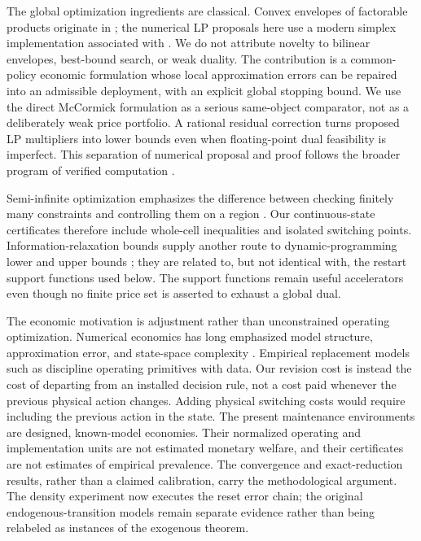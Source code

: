 The global optimization ingredients are classical. Convex envelopes of factorable products originate in \citet{McCormick1976}; the numerical LP proposals here use a modern simplex implementation associated with \citet{HuangfuHall2018}. We do not attribute novelty to bilinear envelopes, best-bound search, or weak duality. The contribution is a common-policy economic formulation whose local approximation errors can be repaired into an admissible deployment, with an explicit global stopping bound. We use the direct McCormick formulation as a serious same-object comparator, not as a deliberately weak price portfolio. A rational residual correction turns proposed LP multipliers into lower bounds even when floating-point dual feasibility is imperfect. This separation of numerical proposal and proof follows the broader program of verified computation \citep{Rump2010}.

Semi-infinite optimization emphasizes the difference between checking finitely many constraints and controlling them on a region \citep{HettichKortanek1993}. Our continuous-state certificates therefore include whole-cell inequalities and isolated switching points. Information-relaxation bounds supply another route to dynamic-programming lower and upper bounds \citep{BrownSmithSun2010,BrownSmith2014}; they are related to, but not identical with, the restart support functions used below. The support functions remain useful accelerators even though no finite price set is asserted to exhaust a global dual.

The economic motivation is adjustment rather than unconstrained operating optimization. Numerical economics has long emphasized model structure, approximation error, and state-space complexity \citep{Judd1998,BrummScheidegger2017}. Empirical replacement models such as \citet{Rust1987} discipline operating primitives with data. Our revision cost is instead the cost of departing from an installed decision rule, not a cost paid whenever the previous physical action changes. Adding physical switching costs would require including the previous action in the state. The present maintenance environments are designed, known-model economies. Their normalized operating and implementation units are not estimated monetary welfare, and their certificates are not estimates of empirical prevalence. The convergence and exact-reduction results, rather than a claimed calibration, carry the methodological argument. The density experiment now executes the reset error chain; the original endogenous-transition models remain separate evidence rather than being relabeled as instances of the exogenous theorem.

